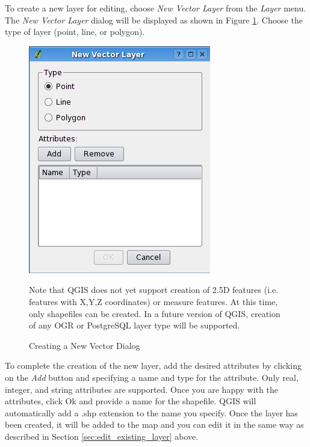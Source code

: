 To create a new layer for editing, choose \textit{New Vector Layer} from the
\textit{Layer} menu. The \textit{New Vector Layer} dialog will be displayed as
shown in Figure \ref{fig:newvectorlayer}. Choose the type of layer (point,
line, or polygon). 
\begin{figure}[h]
   \begin{center}
   \caption{Creating a New Vector Dialog}\label{fig:newvectorlayer}\smallskip
   \includegraphics[scale=.75]{qgis_user_guide_images/newvectorlayer}
\end{center}  
Note that QGIS does not yet support creation of 2.5D
features (i.e. features with X,Y,Z coordinates) or measure features. At this
time, only shapefiles can be created. In a future version of QGIS, creation of
any OGR or PostgreSQL layer type will be supported.

\end{figure}
To complete the creation of the new layer, add the desired attributes by
clicking on the \textit{Add} button and specifying a name and type for the
attribute. Only real, integer, and string attributes are supported. Once you
are happy with the attributes, click Ok and provide a name for the shapefile.
QGIS will automatically add a .shp extension to the name you specify.  Once
the layer has been created, it will be added to the map and you can edit it in
the same way as described in Section \ref{sec:edit_existing_layer} above. 
